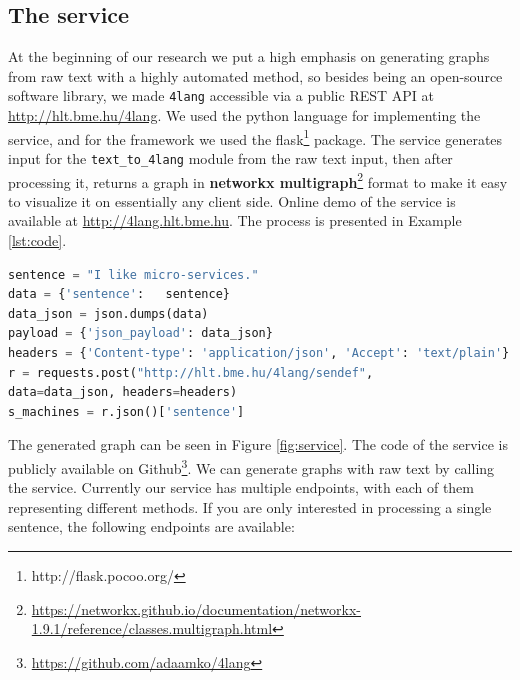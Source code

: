 \subsection{The service}
At the beginning of our research we put a high emphasis on generating graphs from raw text with a highly automated method, so besides being an open-source software library, we made \texttt{4lang} accessible via a public
REST API at \url{http://hlt.bme.hu/4lang}. We used the python language for implementing the service, and for the framework we used the flask\footnote{http://flask.pocoo.org/} package. The service generates input for the \texttt{text\_to\_4lang} module from the raw text input, then after processing it, returns a graph in \textbf{networkx multigraph}\footnote{\url{https://networkx.github.io/documentation/networkx-1.9.1/reference/classes.multigraph.html}} format to make it easy to visualize it on essentially any client side. Online demo of the service is available at \url{http://4lang.hlt.bme.hu}. 
The process is presented in Example \ref{lst:code}.
\begin{center}
	\begin{lstlisting}[caption={Demonstration of the service in python language.},language=python, label={lst:code}]
sentence = "I like micro-services." 
data = {'sentence':   sentence}
data_json = json.dumps(data)
payload = {'json_payload': data_json}
headers = {'Content-type': 'application/json', 'Accept': 'text/plain'}
r = requests.post("http://hlt.bme.hu/4lang/sendef", 
data=data_json, headers=headers)
s_machines = r.json()['sentence']
\end{lstlisting}
\end{center}


The generated graph can be seen in Figure \ref{fig:service}. The code of the service is publicly available on Github\footnote{\url{https://github.com/adaamko/4lang}}. We can generate graphs with raw text by calling the service. Currently our service has multiple endpoints, with each of them representing different methods.
If you are only interested in processing a single sentence, the following endpoints are available:

